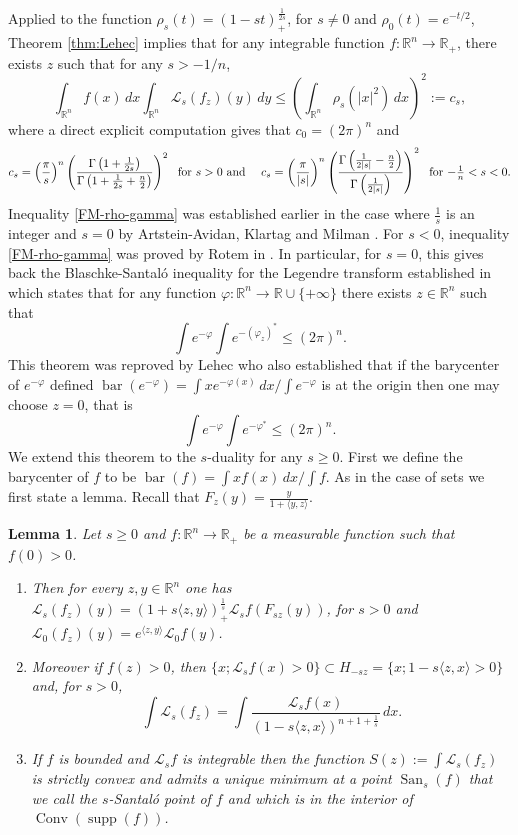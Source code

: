 \documentclass[10pt]{amsart}
\newtheorem{lem}[thm]{Lemma}
\theoremstyle{definition}
\theoremstyle{remark}
\newcommand{\R}{\mathbb{R}}
\renewcommand{\L}{\mathcal{L}}
\newcommand{\conv}{\operatorname{Conv}}
\newcommand{\supp}{\operatorname{supp}}
\newcommand{\bary}{\operatorname{bar}}
\newcommand{\san}{\operatorname{San}}
\begin{document}
Applied to the function $\rho_s(t)=(1-s t)_+^\frac{1}{2s}$, for $s\neq0$ and $\rho_0(t)=e^{-t/2}$, Theorem \ref{thm:Lehec} implies that for any integrable function $f:\R^n\to\R_+$, there exists $z$ such that for any $s>-1/n$, 
\begin{equation}\label{FM-rho-gamma}
\int_{\R^n}f(x)\,dx\int_{\R^n}\L_s (f_z)(y)\,dy\le\left(\int_{\R^n}\rho_s(|x|^2)\,dx\right)^2:=c_s,
\end{equation}
where a direct explicit computation gives that $c_0=(2\pi)^n$ and
\[
c_s= \left(\frac{\pi}{s}\right)^n\left(\frac{\Gamma\left(1+\frac{1}{2s}\right)}{\Gamma\left(1+\frac{1}{2s}+\frac{n}{2}\right)}\right)^2\ \ \hbox{for $s>0$ and }\quad c_s= \left(\frac{\pi}{|s|}\right)^n\left(\frac{\Gamma\left(\frac{1}{2|s|}-\frac{n}{2}\right)}{\Gamma\left(\frac{1}{2|s|}\right)}\right)^2\ \ \hbox{for $-\frac{1}{n}<s<0$.}
\]
Inequality \eqref{FM-rho-gamma} was established earlier in the case where $\frac{1}{s}$ is an integer and $s=0$ by Artstein-Avidan, Klartag and Milman \cite{AAKM05}. For $s<0$, inequality \eqref{FM-rho-gamma} was proved by Rotem in \cite{Rot14}. In particular, for $s=0$, this gives back the Blaschke-Santal\'o inequality for the Legendre transform established in \cite{AAKM05} which states that for any function $\varphi: \R^n\to\R\cup\{+\infty\}$ there exists $z\in\R^n$ such that 
\[
\int e^{-\varphi}\int e^{-(\varphi_z)^*}\le (2\pi)^n.
\]
This theorem was reproved by Lehec \cite{lehec3} who also established that if the barycenter of $e^{-\varphi}$ defined $\bary(e^{-\varphi})=\int xe^{-\varphi(x)}\,dx/\int e^{-\varphi}$ is at the origin then one may choose $z=0$, that is 
\[
\int e^{-\varphi}\int e^{-\varphi^*}\le (2\pi)^n.
\]
 We extend this theorem to the $s$-duality for any $s\ge0$. First we define the barycenter of $f$ to be $\bary(f)=\int xf(x)\,dx/\int f$. 
As in the case of sets we first state a lemma. Recall that $F_z(y)=\frac{y}{1+\langle y,z\rangle}$.

\begin{lem}\label{formula-f-z}
Let $s\ge0$ and $f:\R^n\to\R_+$ be a measurable function such that $f(0)>0$. 
\begin{enumerate}
    \item Then for every $z, y\in\R^n$ one has 
$\L_s(f_z)(y)=(1+s\langle z,y\rangle)_+^\frac{1}{s}\L_s f(F_{s z}(y))$, for $s>0$ and $\L_0(f_z)(y)=e^{\langle z,y\rangle}\L_0f(y)$.
\item Moreover if $f(z)>0$, then $\{x; \L_s f(x)>0\}\subset H_{-s z}=\{x; 1-s\langle z,x\rangle>0\}$ and, for $s>0$,
\begin{equation}\label{formula-gamma-polar}
\int\L_s(f_z)=\int\frac{\L_s f(x)}{(1-s\langle z,x\rangle)^{n+1+\frac{1}{s}}}\,dx.
\end{equation}
\item If $f$ is bounded and $\L_s f$ is integrable then the function $S(z):=\int\L_s(f_z)$ is strictly convex and admits a unique minimum at a point $\san_s(f)$ that we call the $s$-Santal\'o point of $f$ and which is in the interior of $\conv(\supp(f))$.
\end{enumerate}
\end{lem}
\end{document}
